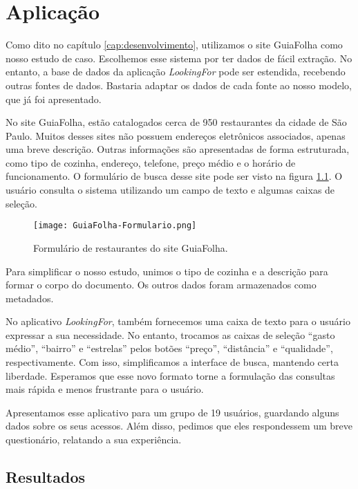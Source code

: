 \chapter{Aplicação}
\label{cap:aplicacao}

Como dito no capítulo \ref{cap:desenvolvimento}, utilizamos o site GuiaFolha como nosso estudo de caso. Escolhemos esse sistema por ter dados de fácil extração. No entanto, a base de dados da aplicação \emph{LookingFor} \cite{Repo} pode ser estendida, recebendo outras fontes de dados. Bastaria adaptar os dados de cada fonte ao nosso modelo, que já foi apresentado.

No site GuiaFolha, estão catalogados cerca de 950 restaurantes da cidade de São Paulo. Muitos desses sites não possuem endereços eletrônicos associados, apenas uma breve descrição. Outras informações são apresentadas de forma estruturada, como tipo de cozinha, endereço, telefone, preço médio e o horário de funcionamento. O formulário de busca desse site pode ser visto na figura \ref{fig:form}. O usuário consulta o sistema utilizando um campo de texto e algumas caixas de seleção.

\begin{figure}[!h]
  \centering
  \texttt{[image: GuiaFolha-Formulario.png]} 
  \caption{Formulário de restaurantes do site GuiaFolha.}
  \label{fig:form} 
\end{figure}

Para simplificar o nosso estudo, unimos o tipo de cozinha e a descrição para formar o corpo do documento. Os outros dados foram armazenados como metadados. 

No aplicativo \emph{LookingFor}, também fornecemos uma caixa de texto para o usuário expressar a sua necessidade. No entanto, trocamos as caixas de seleção ``gasto médio'', ``bairro'' e ``estrelas'' pelos botões ``preço'', ``distância'' e ``qualidade'', respectivamente. Com isso, simplificamos a interface de busca, mantendo certa liberdade. Esperamos que esse novo formato torne a formulação das consultas mais rápida e menos frustrante para o usuário.

Apresentamos esse aplicativo para um grupo de 19 usuários, guardando alguns dados sobre os seus acessos. Além disso, pedimos que eles respondessem um breve questionário, relatando a sua experiência.

\section{Resultados}
\label{sec:resultados}

